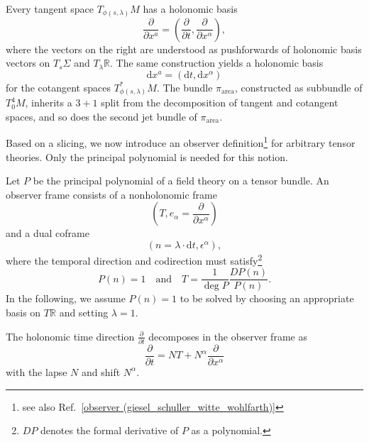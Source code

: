 Every tangent space $T_{\phi(s,\lambda)}M$ has a holonomic basis
\begin{equation}
  \frac{\partial}{\partial x^a} = \left( \frac{\partial}{\partial t},\frac{\partial}{\partial x^\alpha}\right),
\end{equation}
where the vectors on the right are understood as pushforwards of holonomic basis vectors on $T_s\Sigma$ and $T_\lambda\mathbb R$. The same construction yields a holonomic basis
\begin{equation}
  \mathrm dx^a = (\mathrm dt, \mathrm dx^\alpha)
\end{equation}
for the cotangent spaces $T_{\phi(s,\lambda)}^\ast M$. The bundle $\pi_\text{area}$, constructed as subbundle of $T^4_0M$, inherits a $3+1$ split from the decomposition of tangent and cotangent spaces, and so does the second jet bundle of $\pi_\text{area}$.

Based on a slicing, we now introduce an observer definition\footnote{see also Ref.~\ref{observer (giesel_schuller_witte_wohlfarth)}} for arbitrary tensor theories. Only the principal polynomial is needed for this notion.
\begin{definition}
  Let $P$ be the principal polynomial of a field theory on a tensor bundle. An observer frame consists of a nonholonomic frame
  \begin{equation}
    (T, e_\alpha = \frac{\partial}{\partial x^\alpha})
  \end{equation}
  and a dual coframe
  \begin{equation}
    (n = \lambda\cdot \mathrm dt, \epsilon^{\alpha}),
  \end{equation}
  where the temporal direction and codirection must satisfy\footnote{$DP$ denotes the formal derivative of $P$ as a polynomial.}
  \begin{equation}\label{frame_conditions}
    P(n) = 1\quad\text{and}\quad T=\frac{1}{\operatorname{deg}P}\frac{DP(n)}{P(n)}.
  \end{equation}
  In the following, we assume $P(n) = 1$ to be solved by choosing an appropriate basis on $T\mathbb R$ and setting $\lambda = 1$.

  The holonomic time direction $\frac{\partial}{\partial t}$ decomposes in the observer frame as
  \begin{equation}
    \frac{\partial}{\partial t} = NT + N^\alpha \frac{\partial}{\partial x^\alpha}
  \end{equation}
  with the lapse $N$ and shift $N^\alpha$.
\end{definition}

